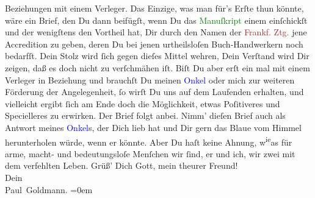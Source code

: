                Beziehungen mit einem Verleger. {\pb}Das Einzige, was
               man für’s Erſte thun könnte, wäre ein Brief, den Du dann beifügſt, wenn Du das \textcolor{green}{Manuſkript}{} einem \label{K_L02709-6v}\label{K_L02709-6h} einſchickſt und der
               wenigſtens den Vortheil hat, Dir durch den Namen der \textcolor{brown}{Frankf. Ztg.}{}\ledrightnote{\textcolor{brown}{Frankfurter Zeitung}} jene Accredition zu geben, deren Du bei jenen urtheilsloſen
               Buch-Handwerkern noch bedarfſt. Dein Stolz wird ſich gegen dieſes Mittel wehren, Dein
               Verſtand wird Dir zeigen, daß es doch {\pb}nicht zu
               verſchmähen iſt. Biſt Du aber erſt ein mal mit einem Verleger in Beziehung und brauchſt Du meinen \textcolor{blue}{Onkel}{} oder mich zur weiteren
               Förderung der Angelegenheit, ſo wirſt Du uns auf dem Laufenden erhalten, und
               vielleicht ergibt ſich am Ende doch die Möglichkeit, etwas Poſitiveres und
               Specielleres zu erwirken.\pend
           \pstart
           Der Brief folgt anbei. {\pb}Nimm' dieſen Brief auch als Antwort meines \textcolor{blue}{Onkel}{}s, der Dich lieb hat und
               Dir gern das Blaue vom Himmel herunterholen würde, wenn er könnte. Aber Du haſt keine
               Ahnung, w\substVorne{}\textsuperscript{ie}\substDazwischen{}as\substHinten{} für arme, macht- und bedeutungsloſe
               Menſchen wir ſind, er und ich, wir zwei mit dem verfehlten Leben.\pend
           \pstart
           Grüß’ Dich Gott, mein theurer Freund! {\\[\baselineskip]}Dein {\\[\baselineskip]}\spacefill\mbox{Paul Goldmann.}\pend
           \leftskip=0em{}\endnumbering{}\begin{anhang}\end{anhang}
      